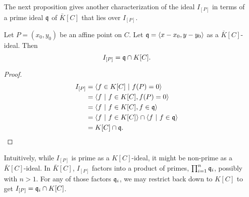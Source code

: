 The next proposition gives another characterization of the ideal $I_{[P]}$
in terms of a prime ideal $\frak q$ of $\bar K[C]$ that lies over $I_{[P]}$.
\begin{proposition}
  Let $P = (x_0, y_0)$ be an affine point on $C$.
  Let $\frak q = \left\langle x - x_0, y - y_0 \right\rangle$ as a $\bar K[C]$-ideal. Then
  \[ I_{[P]} = \frak q \cap K[C]. \]
\end{proposition}
\begin{proof}
  \begin{align*}
    I_{[P]}
      &= \left\langle  f \in K[C] ~|~ f(P) = 0  \right\rangle \\
      &= \left\langle  f ~|~ f \in K[C], f(P) = 0  \right\rangle \\
      &= \left\langle  f ~|~ f \in K[C], f \in \frak q  \right\rangle \\
      &= \left\langle  f ~|~ f \in K[C] \right\rangle \cap \left\langle  f ~|~ f \in \frak q  \right\rangle \\
      &= K[C] \cap \frak q.\qedhere
  \end{align*}
\end{proof}
Intuitively, while $I_{[P]}$ is prime as a $K[C]$-ideal, it might be non-prime as a $\bar K[C]$-ideal.
In $\bar K[C]$, $I_{[P]}$ factors into a product of primes, $\prod_{i=1}^n \frak q_i$,
possibly with $n > 1$.
For any of those factors $\frak q_i$, we may restrict back down to $K[C]$ to get $I_{[P]} = \frak q_i \cap K[C]$. 


